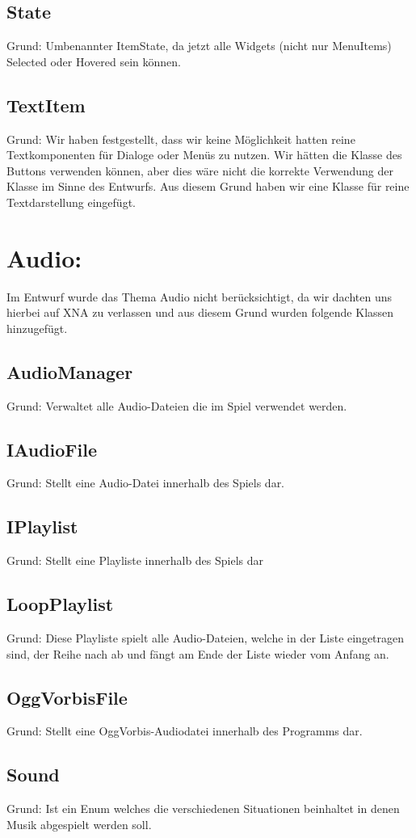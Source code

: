 \subsection{State}
Grund: Umbenannter ItemState, da jetzt alle Widgets (nicht nur MenuItems) Selected oder Hovered sein können.
\subsection{TextItem}
Grund: Wir haben festgestellt, dass wir keine Möglichkeit hatten reine Textkomponenten für Dialoge oder Menüs zu nutzen. Wir hätten die Klasse des Buttons verwenden können, aber dies wäre nicht die korrekte Verwendung der Klasse im Sinne des Entwurfs. Aus diesem Grund haben wir eine Klasse für reine Textdarstellung eingefügt.

\section{Audio:}
Im Entwurf wurde das Thema Audio nicht berücksichtigt, da wir dachten uns hierbei auf XNA zu verlassen und aus diesem Grund wurden folgende Klassen hinzugefügt.
\subsection{AudioManager}
Grund: Verwaltet alle Audio-Dateien die im Spiel verwendet werden. 
\subsection{IAudioFile}
Grund: Stellt eine Audio-Datei innerhalb des Spiels dar.
\subsection{IPlaylist}
Grund: Stellt eine Playliste innerhalb des Spiels dar
\subsection{LoopPlaylist}
Grund: Diese Playliste spielt alle Audio-Dateien, welche in der Liste eingetragen sind, der Reihe nach ab und fängt am Ende der Liste wieder vom Anfang an.
\subsection{OggVorbisFile}
Grund: Stellt eine OggVorbis-Audiodatei innerhalb des Programms dar.
\subsection{Sound}
Grund: Ist ein Enum welches die verschiedenen Situationen beinhaltet in denen Musik abgespielt werden soll. 

